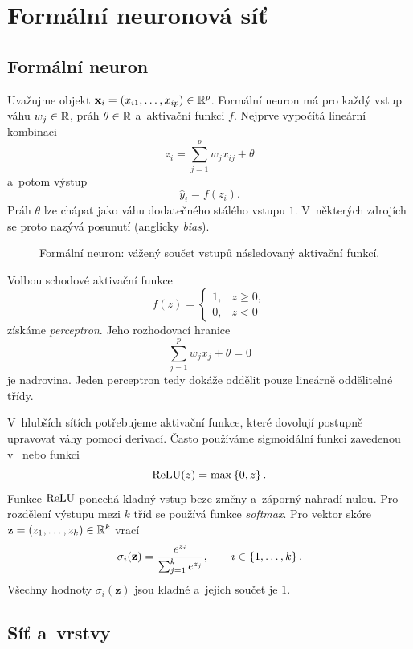 \section{Formální neuronová síť}\label{sec:ai-formalni-neuronova-sit}

\subsection{Formální neuron}

Uvažujme objekt \(\mathbf{x}_i=(x_{i1},\ldots,x_{ip})\in\mathbb{R}^p\). Formální neuron má pro každý vstup váhu \(w_j\in\mathbb{R}\), práh \(\theta\in\mathbb{R}\) a~aktivační funkci \(f\). Nejprve vypočítá lineární kombinaci
\[
    z_i
    =
    \sum_{j=1}^{p}w_jx_{ij}+\theta
\]
a~potom výstup
\[
    \hat y_i=f(z_i).
\]
Práh \(\theta\) lze chápat jako váhu dodatečného stálého vstupu \(1\). V~některých zdrojích se proto nazývá posunutí (anglicky \emph{bias}).

\begin{figure}[ht]
    \centering
    
    \caption{Formální neuron: vážený součet vstupů následovaný aktivační funkcí.}
    \label{fig:ai-formalni-neuron}
\end{figure}

Volbou schodové aktivační funkce
\[
    f(z)
    =
    \begin{cases}
        1, & z\geqslant0,\\
        0, & z<0
    \end{cases}
\]
získáme \emph{perceptron}. Jeho rozhodovací hranice
\[
    \sum_{j=1}^{p}w_jx_j+\theta=0
\]
je nadrovina. Jeden perceptron tedy dokáže oddělit pouze lineárně oddělitelné třídy.

V~hlubších sítích potřebujeme aktivační funkce, které dovolují postupně upravovat váhy pomocí derivací. Často používáme sigmoidální funkci zavedenou v~ nebo funkci
\[
    \operatorname{ReLU}(z)=\max\left\{0,z\right\}.
\]
Funkce \(\operatorname{ReLU}\) ponechá kladný vstup beze změny a~záporný nahradí nulou. Pro rozdělení výstupu mezi \(k\) tříd se používá funkce \emph{softmax}. Pro vektor skóre
\(\mathbf{z}=(z_1,\ldots,z_k)\in\mathbb{R}^k\) vrací
\[
    \sigma_i(\mathbf{z})
    =
    \frac{e^{z_i}}{\sum_{j=1}^{k}e^{z_j}},
    \qquad i\in\left\{1,\ldots,k\right\}.
\]
Všechny hodnoty \(\sigma_i(\mathbf{z})\) jsou kladné a~jejich součet je \(1\).

\subsection{Síť a~vrstvy}

